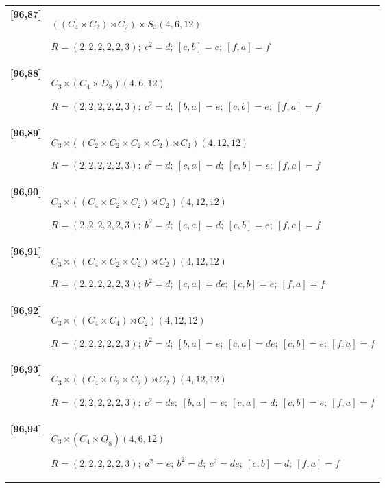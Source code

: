 \documentclass[UTF8,fontset=fandol,11pt,a4paper]{ctexart}
\begin{document}
\begin{longtable}{@{}p{17mm}>{\raggedright\arraybackslash}p{141mm}@{}}
\textbf{[96,87]} & $((C_{4}\times C_{2})\rtimes C_{2})\times S_{3}$\quad $(4,6,12)$\par\(R=(2,2,2,2,2,3);\allowbreak\ c^{2}=d;\allowbreak\ [c,b]=e;\allowbreak\ [f,a]=f\)\\[3pt]

\textbf{[96,88]} & $C_{3}\rtimes (C_{4}\times D_{8})$\quad $(4,6,12)$\par\(R=(2,2,2,2,2,3);\allowbreak\ c^{2}=d;\allowbreak\ [b,a]=e;\allowbreak\ [c,b]=e;\allowbreak\ [f,a]=f\)\\[3pt]

\textbf{[96,89]} & $C_{3}\rtimes ((C_{2}\times C_{2}\times C_{2}\times C_{2})\rtimes C_{2})$\quad $(4,12,12)$\par\(R=(2,2,2,2,2,3);\allowbreak\ c^{2}=d;\allowbreak\ [c,a]=d;\allowbreak\ [c,b]=e;\allowbreak\ [f,a]=f\)\\[3pt]

\textbf{[96,90]} & $C_{3}\rtimes ((C_{4}\times C_{2}\times C_{2})\rtimes C_{2})$\quad $(4,12,12)$\par\(R=(2,2,2,2,2,3);\allowbreak\ b^{2}=d;\allowbreak\ [c,a]=d;\allowbreak\ [c,b]=e;\allowbreak\ [f,a]=f\)\\[3pt]

\textbf{[96,91]} & $C_{3}\rtimes ((C_{4}\times C_{2}\times C_{2})\rtimes C_{2})$\quad $(4,12,12)$\par\(R=(2,2,2,2,2,3);\allowbreak\ b^{2}=d;\allowbreak\ [c,a]=de;\allowbreak\ [c,b]=e;\allowbreak\ [f,a]=f\)\\[3pt]

\textbf{[96,92]} & $C_{3}\rtimes ((C_{4}\times C_{4})\rtimes C_{2})$\quad $(4,12,12)$\par\(R=(2,2,2,2,2,3);\allowbreak\ b^{2}=d;\allowbreak\ [b,a]=e;\allowbreak\ [c,a]=de;\allowbreak\ [c,b]=e;\allowbreak\ [f,a]=f\)\\[3pt]

\textbf{[96,93]} & $C_{3}\rtimes ((C_{4}\times C_{2}\times C_{2})\rtimes C_{2})$\quad $(4,12,12)$\par\(R=(2,2,2,2,2,3);\allowbreak\ c^{2}=de;\allowbreak\ [b,a]=e;\allowbreak\ [c,a]=d;\allowbreak\ [c,b]=e;\allowbreak\ [f,a]=f\)\\[3pt]

\textbf{[96,94]} & $C_{3}\rtimes (C_{4}\times Q_{8})$\quad $(4,6,12)$\par\(R=(2,2,2,2,2,3);\allowbreak\ a^{2}=e;\allowbreak\ b^{2}=d;\allowbreak\ c^{2}=de;\allowbreak\ [c,b]=d;\allowbreak\ [f,a]=f\)\\[3pt]


\end{longtable}
\end{document}
